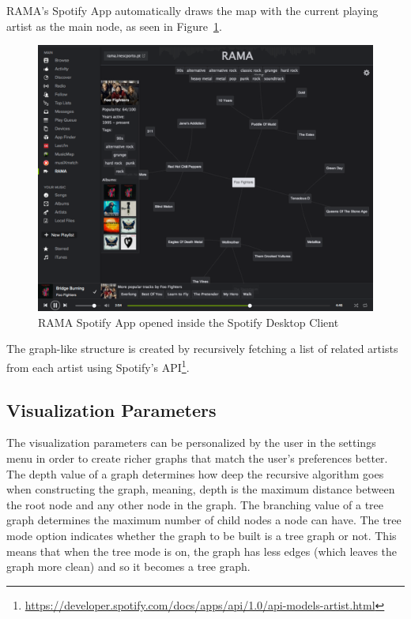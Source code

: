 \documentclass{article}
\begin{document}
      RAMA's Spotify App automatically draws the map with the current playing artist as the main node, as seen in Figure~\ref{fig:spotify_app}.
      \begin{figure}[hb]
        \begin{center}
          \includegraphics[width=\columnwidth]{../report/figures/graph_rootnode.pdf}
        \end{center}
        \caption{RAMA Spotify App opened inside the Spotify Desktop Client}
        \label{fig:spotify_app}
      \end{figure}
      The graph-like structure is created by recursively fetching a list of related artists from each artist using Spotify's API\footnote{\url{https://developer.spotify.com/docs/apps/api/1.0/api-models-artist.html}}.

    \subsection{Visualization Parameters} %
    \label{sub:visualization_parameters}

      The visualization parameters can be personalized by the user in the settings menu in order to create richer graphs that match the user's preferences better.
      The depth value of a graph determines how deep the recursive algorithm goes when constructing the graph, meaning, depth is the maximum distance between the root node and any other node in the graph.
      The branching value of a tree graph determines the maximum number of child nodes a node can have.
      The tree mode option indicates whether the graph to be built is a tree graph or not.
      This means that when the tree mode is on, the graph has less edges (which leaves the graph more clean) and so it becomes a tree graph.
\end{document}
